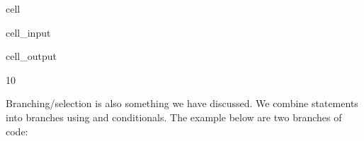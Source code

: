 \documentclass[letterpaper,10pt,english]{jupyterBook}
\begin{document}
\begin{sphinxuseclass}{cell}\begin{sphinxVerbatimInput}

\begin{sphinxuseclass}{cell_input}
\begin{sphinxVerbatim}[commandchars=\\\{\}]
  
  
\end{sphinxVerbatim}

\end{sphinxuseclass}\end{sphinxVerbatimInput}
\begin{sphinxVerbatimOutput}

\begin{sphinxuseclass}{cell_output}
\begin{sphinxVerbatim}[commandchars=\\\{\}]
10
\end{sphinxVerbatim}

\end{sphinxuseclass}\end{sphinxVerbatimOutput}

\end{sphinxuseclass}
\sphinxAtStartPar
Branching/selection is also something we have discussed. We combine statements into branches using  and  conditionals. The example below are two branches of code:
\end{document}
